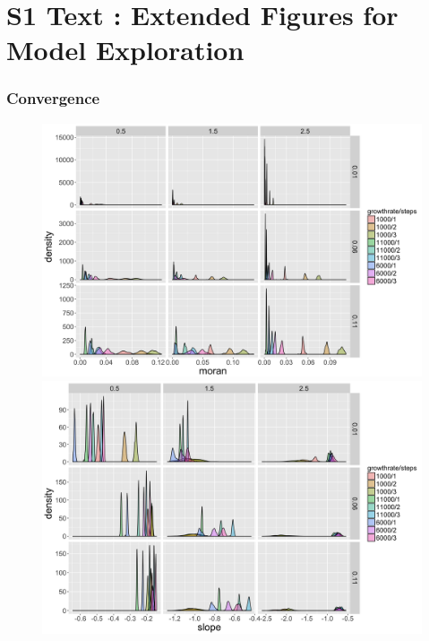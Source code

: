 



\section*{S1 Text : Extended Figures for Model Exploration}


\subsubsection*{Convergence}





\begin{figure}
\centering
\includegraphics[width=\textwidth]{figuresraw/hist_moran}\\
\includegraphics[width=\textwidth]{figuresraw/hist_slope}
\caption{}
\label{}
\end{figure}






